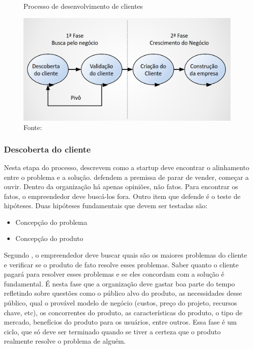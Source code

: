 \begin{figure}[H]
\caption{Processo de desenvolvimento de clientes}
\centerline{\includegraphics[scale=0.5]{img/desenvolvimento_de_clientes}}
\label{fig:desenvolvimento_de_clientes}
\caption* {Fonte: }
\end{figure}

\subsubsection{Descoberta do cliente}
\label{cha:descoberta_do_cliente}
Nesta etapa do processo,  descrevem como a startup deve encontrar o alinhamento entre o problema e a solução.
 defendem a premissa de parar de vender, começar a ouvir. Dentro da organização há apenas opiniões, não fatos. Para encontrar os fatos, o empreendedor deve buscá-los fora.
Outro item que  defende é o teste de hipóteses. Duas hipóteses fundamentais que devem ser testadas são: 
\begin{itemize}
\item Concepção do problema
\item Concepção do produto
\end{itemize}

Segundo , o empreendedor deve buscar quais são os maiores problemas do cliente e verificar se o produto de fato resolve esses problemas. Saber quanto o cliente pagará para resolver esses problemas e se eles concordam com a solução é fundamental. É nesta fase que a organização deve gastar boa parte do tempo refletindo sobre questões como o público alvo do produto, as necessidades desse público, qual o provável modelo de negócio (custos, preço do projeto, recursos chave, etc), os concorrentes do produto, as características do produto, o tipo de mercado, benefícios do produto para os usuários, entre outros. Essa fase é um ciclo, que só deve ser terminado quando se tiver a certeza que o produto realmente resolve o problema de alguém.

